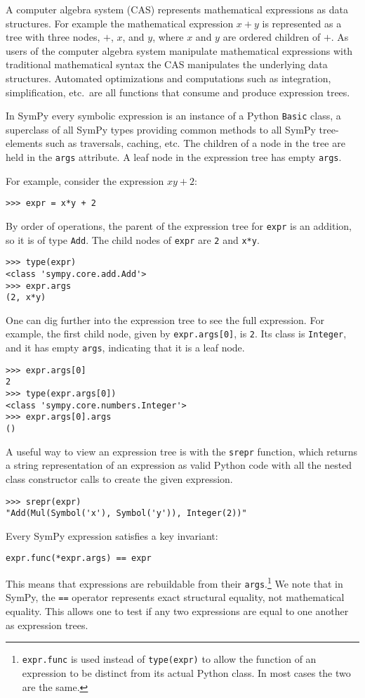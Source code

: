 A computer algebra system (CAS) represents mathematical expressions as data
structures.  For example the mathematical expression $x + y$ is represented as
a tree with three nodes, $+$, $x$, and $y$, where $x$ and $y$ are ordered
children of $+$.  As users of the computer algebra system manipulate
mathematical expressions with traditional mathematical syntax the CAS
manipulates the underlying data structures.  Automated optimizations and
computations such as integration, simplification, etc.\ are all functions that
consume and produce expression trees.

In SymPy every symbolic expression is an instance of a Python \texttt{Basic}
class, a superclass of all SymPy types providing common methods to all SymPy
tree-elements such as traversals, caching, etc.  The children of a node in the
tree are held in the \texttt{args} attribute.  A leaf node in the expression
tree has empty \texttt{args}.

For example, consider the expression $xy + 2$:
\begin{verbatim}
>>> expr = x*y + 2
\end{verbatim}
By order of operations, the parent of the expression tree for \texttt{expr} is
an addition, so it is of type \texttt{Add}. The child nodes of \texttt{expr} are
\texttt{2} and \texttt{x*y}.
\begin{verbatim}
>>> type(expr)
<class 'sympy.core.add.Add'>
>>> expr.args
(2, x*y)
\end{verbatim}

One can dig further into the expression tree to see the full expression. For
example, the first child node, given by \texttt{expr.args[0]}, is
\texttt{2}. Its class is \texttt{Integer}, and it has empty \texttt{args},
indicating that it is a leaf node.
\begin{verbatim}
>>> expr.args[0]
2
>>> type(expr.args[0])
<class 'sympy.core.numbers.Integer'>
>>> expr.args[0].args
()
\end{verbatim}

A useful way to view an expression tree is with the \texttt{srepr} function,
which returns a string representation of an expression as valid Python code
with all the nested class constructor calls to create the given expression.
\begin{verbatim}
>>> srepr(expr)
"Add(Mul(Symbol('x'), Symbol('y')), Integer(2))"
\end{verbatim}

Every SymPy expression satisfies a key invariant:
\begin{verbatim}
expr.func(*expr.args) == expr
\end{verbatim}
This means that expressions are
rebuildable from their \texttt{args}.\footnote{\texttt{expr.func} is used
instead of \texttt{type(expr)} to allow the function of an expression to be
distinct from its actual Python class. In most cases the two are the same.}
We note that in SymPy, the \texttt{==} operator represents exact
structural equality, not mathematical equality. This allows one to test if
any two expressions are equal to one another as expression trees.

